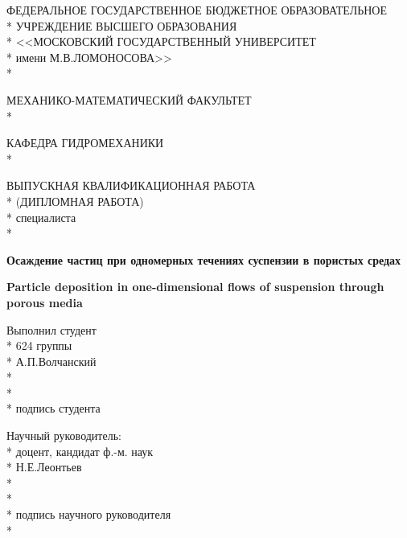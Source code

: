 \documentclass[a4paper,14pt]{article}
\begin{document}
\begin{titlepage}
\begin{center}
ФЕДЕРАЛЬНОЕ ГОСУДАРСТВЕННОЕ БЮДЖЕТНОЕ ОБРАЗОВАТЕЛЬНОЕ \\*
УЧРЕЖДЕНИЕ ВЫСШЕГО ОБРАЗОВАНИЯ \\*
<<МОСКОВСКИЙ ГОСУДАРСТВЕННЫЙ УНИВЕРСИТЕТ \\*
имени М.В.ЛОМОНОСОВА>> \\*
\end{center}

\begin{center}
МЕХАНИКО-МАТЕМАТИЧЕСКИЙ ФАКУЛЬТЕТ \\*
\end{center}

\begin{center}
КАФЕДРА ГИДРОМЕХАНИКИ \\*
\end{center}

\begin{center}
\vspace{2cm}
ВЫПУСКНАЯ КВАЛИФИКАЦИОННАЯ РАБОТА \\*
(ДИПЛОМНАЯ РАБОТА) \\*
специалиста \\*
\end{center}

\begin{center}
\Large \textbf{Осаждение частиц при одномерных течениях суспензии в пористых средах}
\end{center}

\begin{center}
\Large \textbf{Particle deposition in one-dimensional flows of suspension through porous media}
\end{center}

\begin{flushright}
\begin{minipage}{10cm}
Выполнил студент \\*
624 группы \\*
А.П.Волчанский \\*
\vspace{1cm} \\*
\underline{\hspace{2in}} \\*
подпись студента\\
\end{minipage}
\end{flushright}

\begin{flushright}
\begin{minipage}{10cm}
Научный руководитель: \\*
доцент, кандидат ф.-м. наук \\*
Н.Е.Леонтьев \\*
\vspace{1cm} \\*
\underline{\hspace{2in}} \\*
подпись научного руководителя \\*
\end{minipage}
\end{flushright}


\end{titlepage}
\end{document}
